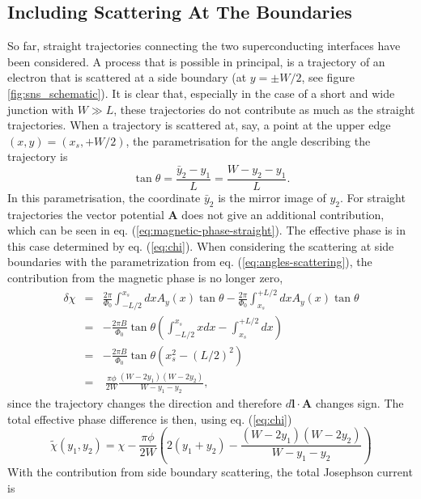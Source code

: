 \subsection*{Including Scattering At The Boundaries}
So far, straight trajectories connecting the two superconducting interfaces have been considered. A process that is possible in principal, is a trajectory of an electron that is scattered at a side boundary (at $y = \pm W/2$, see figure \ref{fig:sns_schematic}). It is clear that, especially in the case of a short and wide junction with $W \gg L$, these trajectories do not contribute as much as the straight trajectories. When a trajectory is scattered at, say, a point at the upper edge $(x, y) = (x_s, + W/2)$, the parametrisation for the angle describing the trajectory is
\begin{equation}
\tan \theta = \frac{\bar{y}_2 - y_1}{L} = \frac{W - y_2 - y_1}{L}. \label{eq:angles-scattering}
\end{equation}
In this parametrisation, the coordinate $\bar{y}_2$ is the mirror image of $y_2$. For straight trajectories the vector potential $\mathbf{A}$ does not give an additional contribution, which can be seen in eq. (\ref{eq:magnetic-phase-straight}). The effective phase is in this case determined by eq. (\ref{eq:chi}). When considering the scattering at side boundaries with the parametrization from eq. (\ref{eq:angles-scattering}), the contribution from the magnetic phase is no longer zero,
\begin{eqnarray}
\delta \chi &=& \frac{2 \pi}{\Phi_0} \int_{-L/2}^{x_s} dx A_y(x) \tan \theta  - \frac{2 \pi}{\Phi_0} \int_{x_s}^{+L/2} dx A_y(x) \tan \theta \\
&=& - \frac{2 \pi B }{\Phi_0 } \tan \theta \left( \int_{-L/2}^{x_s} x dx - \int_{x_s}^{+L/2} dx \right) \\
&=& - \frac{2 \pi B}{\Phi_0 } \tan \theta \left( x_s^2 - (L/2)^2 \right) \\
&=& ~ \frac{\pi \phi}{2 W} \frac{(W - 2 y_1) ( W - 2y_2)}{W - y_1 - y_2},
\end{eqnarray}
since the trajectory changes the direction and therefore $d \mathbf{l} \cdot \mathbf{A}$ changes sign. The total effective phase difference is then, using eq. (\ref{eq:chi})
\begin{equation}
\tilde{\chi} (y_1, y_2) = \chi - \frac{\pi \phi}{2 W} \left( 2 (y_1 + y_2) - \frac{(W-2y_1)(W-2y_2)}{W - y_1 - y_2} \right)
\end{equation}
With the contribution from side boundary scattering, the total Josephson current is
